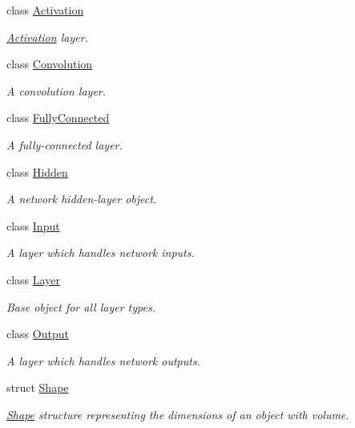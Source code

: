 \begin{DoxyCompactItemize}
\item 
class \hyperlink{classffnn_1_1layer_1_1_activation}{Activation}
\begin{DoxyCompactList}\small\item\em \hyperlink{classffnn_1_1layer_1_1_activation}{Activation} layer. \end{DoxyCompactList}\item 
class \hyperlink{classffnn_1_1layer_1_1_convolution}{Convolution}
\begin{DoxyCompactList}\small\item\em A convolution layer. \end{DoxyCompactList}\item 
class \hyperlink{classffnn_1_1layer_1_1_fully_connected}{Fully\-Connected}
\begin{DoxyCompactList}\small\item\em A fully-\/connected layer. \end{DoxyCompactList}\item 
class \hyperlink{classffnn_1_1layer_1_1_hidden}{Hidden}
\begin{DoxyCompactList}\small\item\em A network hidden-\/layer object. \end{DoxyCompactList}\item 
class \hyperlink{classffnn_1_1layer_1_1_input}{Input}
\begin{DoxyCompactList}\small\item\em A layer which handles network inputs. \end{DoxyCompactList}\item 
class \hyperlink{classffnn_1_1layer_1_1_layer}{Layer}
\begin{DoxyCompactList}\small\item\em Base object for all layer types. \end{DoxyCompactList}\item 
class \hyperlink{classffnn_1_1layer_1_1_output}{Output}
\begin{DoxyCompactList}\small\item\em A layer which handles network outputs. \end{DoxyCompactList}\item 
struct \hyperlink{structffnn_1_1layer_1_1_shape}{Shape}
\begin{DoxyCompactList}\small\item\em \hyperlink{structffnn_1_1layer_1_1_shape}{Shape} structure representing the dimensions of an object with volume. \end{DoxyCompactList}\end{DoxyCompactItemize}

